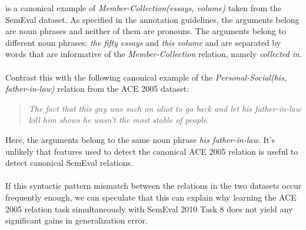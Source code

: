 is a canonical example of \textit{Member-Collection(essays, volume)} taken from the SemEval dataset. As specified in the annotation guidelines, the arguments belong are noun phrases and neither of them are pronouns. The arguments belong to different noun phrases: \textit{the fifty essays} and \textit{this volume} and are separated by words that are informative of the \textit{Member-Collection} relation, namely \textit{collected in}.
\\\\
Contrast this with the following canonical example of the \textit{Personal-Social(his, father-in-law)} relation from the ACE 2005 dataset: 
\begin{quote}
\textit{The fact that this guy was such an idiot to go back and let his father-in-law kill him shows he wasn't the most stable of people}.	
\end{quote}
 Here, the arguments belong to the same noun phrase \textit{his father-in-law}. It's unlikely that features used to detect the canonical ACE 2005 relation is useful to detect canonical SemEval relations.
\\\\
If this syntactic pattern mismatch between the relations in the two datasets occur frequently enough, we can speculate that this can explain why learning the ACE 2005 relation task simultaneously with SemEval 2010 Task 8 does not yield any significant gains in generalization error.

